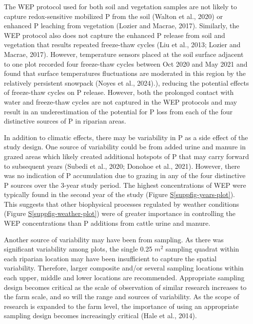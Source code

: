 \documentclass[
]{agujournal2019}
\newcommand*\quartosuppfigref[1]{Figure \hyperref[#1]{S\ref{#1}}}
\begin{document}
The WEP protocol used for both soil and vegetation samples are not
likely to capture redox-sensitive mobilized P from the soil (Walton et
al., 2020) or enhanced P leaching from vegetation (Lozier and Macrae,
2017). Similarly, the WEP protocol also does not capture the enhanced P
release from soil and vegetation that results repeated freeze-thaw
cycles (Liu et al., 2013; Lozier and Macrae, 2017). However, temperature
sensors placed at the soil surface adjacent to one plot recorded four
freeze-thaw cycles between Oct 2020 and May 2021 and found that surface
temperatures fluctuations are moderated in this region by the relatively
persistent snowpack (Noyes et al., 2024).), reducing the potential
effects of freeze-thaw cycles on P release. However, both the prolonged
contact with water and freeze-thaw cycles are not captured in the WEP
protocols and may result in an underestimation of the potential for P
loss from each of the four distinctive sources of P in riparian areas.

In addition to climatic effects, there may be variability in P as a side
effect of the study design. One source of variability could be from
added urine and manure in grazed areas which likely created additional
hotspots of P that may carry forward to subsequent years (Subedi et al.,
2020; Donohoe et al., 2021). However, there was no indication of P
accumulation due to grazing in any of the four distinctive P sources
over the 3-year study period. The highest concentrations of WEP were
typically found in the second year of the study
(\quartosuppfigref{suppfig-years-plot}). This suggests that other
biophysical processes regulated by weather conditions
(\quartosuppfigref{suppfig-weather-plot}) were of greater importance in
controlling the WEP concentrations than P additions from cattle urine
and manure.

Another source of variability may have been from sampling. As there was
significant variability among plots, the single 0.25 \(m^2\) sampling
quadrat within each riparian location may have been insufficient to
capture the spatial variability. Therefore, larger composite and/or
several sampling locations within each upper, middle and lower locations
are recommended. Appropriate sampling design becomes critical as the
scale of observation of similar research increases to the farm scale,
and so will the range and sources of variability. As the scope of
research is expanded to the farm level, the importance of using an
appropriate sampling design becomes increasingly critical (Hale et al.,
2014).
\end{document}
